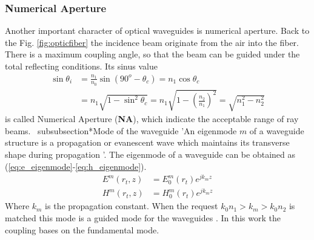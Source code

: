 \subsubsection*{Numerical Aperture }
Another important character of optical waveguides is numerical aperture. Back to the Fig. \ref{fig:opticfiber} the incidence beam originate from the air into the fiber. There is a maximum coupling angle, so that the beam can be guided under the total reflecting conditions. Its sinus value 
\begin{align}
\sin\theta_{i}&=\frac{n_{1}}{n_{0}}\sin(90^{o}-\theta_{c})=n_{1}\cos\theta_{c} \nonumber\\
&=n_{1}\sqrt{1-\sin^{2}\theta_{c}}=n_{1}\sqrt{1-\left(\frac{n_{2}}{n_{1}}\right)^2}=\sqrt{n^2_{1}-n^2_{2}}
\label{eq:NA}
\end{align}
 is called Numerical Aperture (\textbf{NA}), which indicate the acceptable range of ray beams.
\ subsubsection*{Mode of the waveguide}
'An eigenmode $m$ of a waveguide structure is a propagation or evanescent wave which maintains its transverse shape during propagation '\cite{integrated_optics}. The eigenmode of a waveguide can be obtained as (\ref{eq:e_eigenmode}-\ref{eq:h_eigenmode}).  
\begin{align}
E^{m}(r_{t},z)&=E^{m}_{0}(r_{t})e^{jk_{m}z}
\label{eq:e_eigenmode}\\
H^{m}(r_{t},z)&=H^{m}_{0}(r_{t})e^{jk_{m}z}
\label{eq:h_eigenmode}
\end{align}
Where $k_{m}$ is the propagation constant. When the request  $k_{0}n_{1}>k_{m}>k_{0}n_{2}$ is matched this mode is a guided mode for the waveguides \cite{script_FT_TET}. In this work the coupling bases on the fundamental mode.
